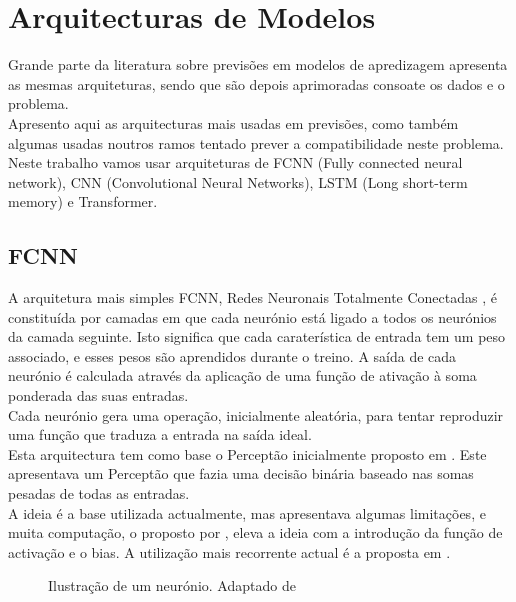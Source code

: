 \chapter{Arquitecturas de Modelos\label{ch:arquiteturas_modelos}}

Grande parte da literatura sobre previsões em modelos de apredizagem apresenta as mesmas arquiteturas, sendo que são depois aprimoradas consoate os dados e o problema. \\
Apresento aqui as arquitecturas mais usadas em previsões, como também algumas usadas noutros ramos tentado prever a compatibilidade neste problema. \\
Neste trabalho vamos usar arquiteturas de FCNN (Fully connected neural network), CNN (Convolutional Neural Networks), LSTM (Long short-term memory) e Transformer.\\




\section{FCNN\label{se:fcnn_sec}}

A arquitetura mais simples FCNN, Redes Neuronais Totalmente Conectadas , é constituída por camadas em que cada neurónio está ligado a todos os neurónios da camada seguinte. Isto significa que cada caraterística de entrada tem um peso associado, e esses pesos são aprendidos durante o treino. A saída de cada neurónio é calculada através da aplicação de uma função de ativação à soma ponderada das suas entradas.\\
Cada neurónio gera uma operação, inicialmente aleatória, para tentar reproduzir uma função que traduza a entrada na saída ideal.\\
Esta arquitectura tem como base o Perceptão inicialmente proposto em \cite{Rosenblatt1958}. Este apresentava um Perceptão que fazia uma decisão binária baseado nas somas pesadas de todas as entradas.\\
A ideia é a base utilizada actualmente, mas apresentava algumas limitações, e muita computação, o proposto por \cite{Minsky1969}, eleva a ideia com a introdução da função de activação e o bias. A utilização mais recorrente actual é a proposta em \cite{Haykin1999}.


\begin{figure}[H]
	\centering
	\resizebox{\linewidth}{!}{}
	\caption{Ilustração de um neurónio. Adaptado de \cite{Haykin1999}}
	\label{fig:neuronio}
\end{figure}



